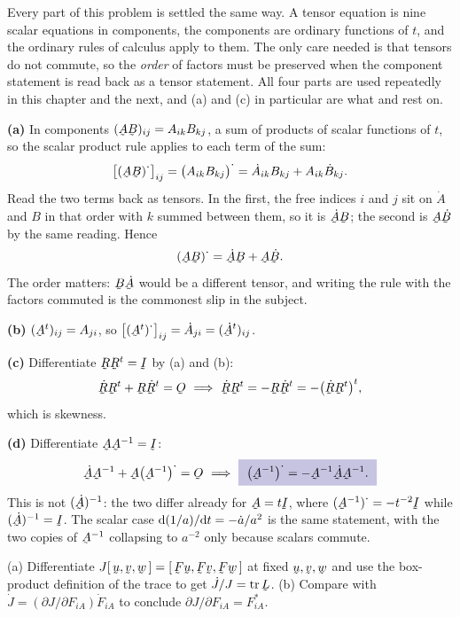 \begin{solution}
Every part of this problem is settled the same way. A tensor equation is
nine scalar equations in components, the components are ordinary functions
of $t$, and the ordinary rules of calculus apply to them. The only care
needed is that tensors do not commute, so the \emph{order} of factors must
be preserved when the component statement is read back as a tensor
statement. All four parts are used repeatedly in this chapter and the
next, and (a) and (c) in particular are what  and  rest
on.

\textbf{(a)} In components $(\bA\bB)_{ij}=A_{ik}B_{kj}$, a sum of products
of scalar functions of $t$, so the scalar product rule applies to each
term of the sum:
\[
   \big[(\bA\bB)^{\textstyle\cdot}\big]_{ij}
   =\big(A_{ik}B_{kj}\big)^{\textstyle\cdot}
   =\dot A_{ik}B_{kj}+A_{ik}\dot B_{kj}.
\]
Read the two terms back as tensors. In the first, the free indices $i$ and
$j$ sit on $\dot A$ and $B$ in that order with $k$ summed between them, so
it is $\dot\bA\bB$; the second is $\bA\dot\bB$ by the same reading. Hence
\[
   (\bA\bB)^{\textstyle\cdot}=\dot\bA\bB+\bA\dot\bB .
\]
The order matters: $\bB\dot\bA$ would be a different tensor, and writing
the rule with the factors commuted is the commonest slip in the subject.

\textbf{(b)} $(\bA^{t})_{ij}=A_{ji}$, so
$\big[(\bA^{t})^{\textstyle\cdot}\big]_{ij}=\dot A_{ji}
=(\dot\bA^{t})_{ij}$.

\textbf{(c)} Differentiate $\bR\bR^{t}=\I$ by (a) and (b):
\[
   \dot\bR\bR^{t}+\bR\dot\bR^{t}=\Ob
   \ \Longrightarrow\
   \dot\bR\bR^{t}=-\bR\dot\bR^{t}=-\big(\dot\bR\bR^{t}\big)^{t},
\]
which is skewness.

\textbf{(d)} Differentiate $\bA\bA^{-1}=\I$:
\[
   \dot\bA\bA^{-1}+\bA\big(\bA^{-1}\big)^{\textstyle\cdot}=\Ob
   \ \Longrightarrow\
   \boxed{\ \big(\bA^{-1}\big)^{\textstyle\cdot}
   =-\bA^{-1}\dot\bA\bA^{-1}.\ }
\]
This is not $(\dot\bA)^{-1}$: the two differ already for
$\bA=t\I$, where $(\bA^{-1})^{\textstyle\cdot}=-t^{-2}\I$ while
$(\dot\bA)^{-1}=\I$. The scalar case $\mathrm{d}(1/a)/\mathrm{d} t=-\dot a/a^{2}$ is the
same statement, with the two copies of $\bA^{-1}$ collapsing to $a^{-2}$
only because scalars commute.
\end{solution}

\begin{problem}[$\dot J=J\tr\bL$, and $\partial J/\partial F_{iA}=F^{*}_{iA}$]
(a) Differentiate $J\tbox\bu\bv\bw=\tbox{\bF\bu}{\bF\bv}{\bF\bw}$ at fixed
$\bu,\bv,\bw$ and use the box-product definition of the trace to get
$\dot J/J=\tr\bL$.
(b) Compare with $\dot J=(\partial J/\partial F_{iA})\dot F_{iA}$ to
conclude $\partial J/\partial F_{iA}=F^{*}_{iA}$.
\end{problem}

